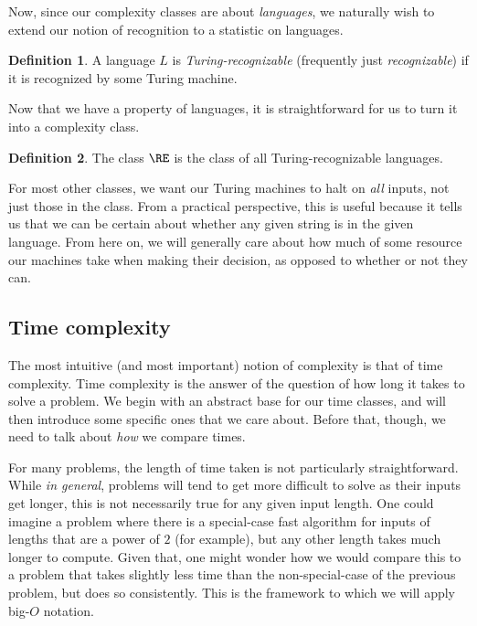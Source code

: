 \documentclass[english,12pt]{reedthesis}
\theoremstyle{plain}
\theoremstyle{definition}
\newtheorem{defn}[defn]{Definition}
\theoremstyle{remark}
\begin{document}
Now, since our complexity classes are about \emph{languages}, we naturally wish
to extend our notion of recognition to a statistic on languages.

\begin{defn}\label{def:turing-recognizable}
  A language $L$ is \emph{Turing-recognizable} (frequently just
  \emph{recognizable}) if it is recognized by some Turing machine.
\end{defn}

Now that we have a property of languages, it is straightforward for us to turn
it into a complexity class.

\begin{defn}\label{def:re}
  The class $\RE$ is the class of all Turing-recognizable languages.
\end{defn}

For most other classes, we want our Turing machines to halt on \emph{all}
inputs, not just those in the class. From a practical perspective, this is
useful because it tells us that we can be certain about whether any given string
is in the given language. From here on, we will generally care about how much of
some resource our machines take when making their decision, as opposed to
whether or not they can.

\subsection{Time complexity}

The most intuitive (and most important) notion of complexity is that of time
complexity. Time complexity is the answer of the question of how long it takes
to solve a problem. We begin with an abstract base for our time classes, and
will then introduce some specific ones that we care about. Before that, though,
we need to talk about \emph{how} we compare times.

For many problems, the length of time taken is not particularly straightforward.
While \emph{in general}, problems will tend to get more difficult to solve as
their inputs get longer, this is not necessarily true for any given input
length. One could imagine a problem where there is a special-case fast algorithm
for inputs of lengths that are a power of $2$ (for example), but any other
length takes much longer to compute. Given that, one might wonder how we would
compare this to a problem that takes slightly less time than the
non-special-case of the previous problem, but does so consistently. This is the
framework to which we will apply big-$O$ notation.
\end{document}

